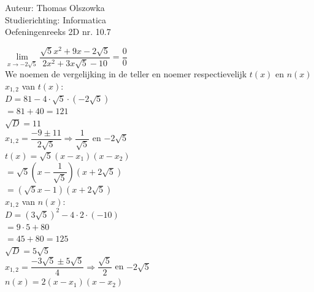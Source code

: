 \documentclass[a4paper]{article}
\newcommand{\llim}{\lim\limits}
\begin{document}
\noindent \large Auteur: Thomas Olszowka \\
\noindent \large Studierichting: Informatica \\
\noindent \large Oefeningenreeks 2D nr. 10.7  \\



\medskip

\normalsize

$\llim_{x \rightarrow -2\sqrt{5}} \dfrac{\sqrt{5}x^2 + 9x - 2\sqrt{5}}{2x^2 + 3x\sqrt{5} - 10} = \dfrac{0}{0}$ \\

We noemen de vergelijking in de teller en noemer respectievelijk $t(x)$ en $n(x)$\\

$x_{1,2}$ van $t(x)$: \\

$D = 81 - 4\cdot \sqrt{5} \cdot \left(-2\sqrt{5}\right)$ \\

$= 81 +40 = 121$ \\

$\sqrt{D} = 11$ \\

$x_{1,2} = \dfrac{-9 \pm 11}{2\sqrt{5}} \Rightarrow \dfrac{1}{\sqrt{5}}$ en $-2\sqrt{5}$ \\

$t(x) = \sqrt{5}(x-x_1)(x-x_2)$ \\

$= \sqrt{5}\left(x - \dfrac{1}{\sqrt{5}}\right)\left(x + 2\sqrt{5}\right)$ \\

$= \left(\sqrt{5}x - 1\right) \left(x + 2\sqrt{5}\right)$ \\

$x_{1,2}$ van $n(x)$: \\

$D = \left(3\sqrt{5}\right)^2 - 4\cdot 2 \cdot(-10)$ \\

$= 9 \cdot 5 + 80$ \\

$= 45 + 80 = 125$ \\

$\sqrt{D} = 5\sqrt{5}$ \\

$x_{1,2} = \dfrac{-3\sqrt{5} \pm 5\sqrt{5}}{4} \Rightarrow \dfrac{\sqrt{5}}{2}$ en $-2\sqrt{5}$ \\

$n(x) = 2(x-x_1)(x-x_2)$ \\
\end{document}

